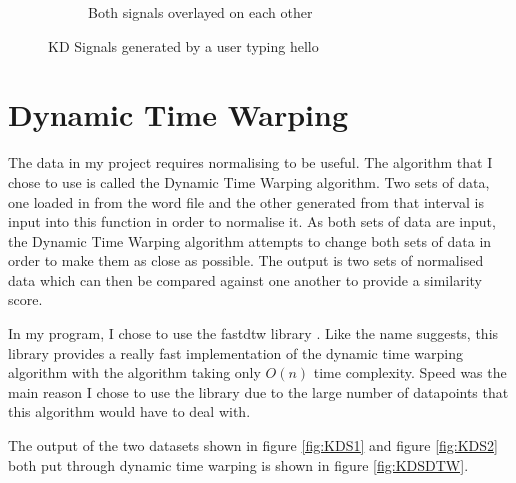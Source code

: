 \documentclass[10pt,a4paper]{report}
\begin{document}
\begin{figure}
\begin{subfigure}[b]{0.3\textwidth}
		\caption{Both signals overlayed on each other}
		\label{fig:KDSBoth}
	\end{subfigure}
	\caption{KD Signals generated by a user typing hello}
	\label{fig:KDS}
\end{figure}

\section{Dynamic Time Warping}


The data in my project requires normalising to be useful. The algorithm that I chose to use is called the Dynamic Time Warping algorithm. Two sets of data, one loaded in from the word file and the other generated from that interval is input into this function in order to normalise it. As both sets of data are input, the Dynamic Time Warping algorithm attempts to change both sets of data in order to make them as close as possible. The output is two sets of normalised data which can then be compared against one another to provide a similarity score. 

In my program, I chose to use the fastdtw library \cite{tandi_2015}. Like the name suggests, this library provides a really fast implementation of the dynamic time warping algorithm with the algorithm taking only \(O(n)\) time complexity\cite{tandi_2015}. Speed was the main reason I chose to use the library due to the large number of datapoints that this algorithm would have to deal with.

The output of the two datasets shown in figure \ref{fig:KDS1} and figure \ref{fig:KDS2} both put through dynamic time warping is shown in figure \ref{fig:KDSDTW}.
\end{document}
